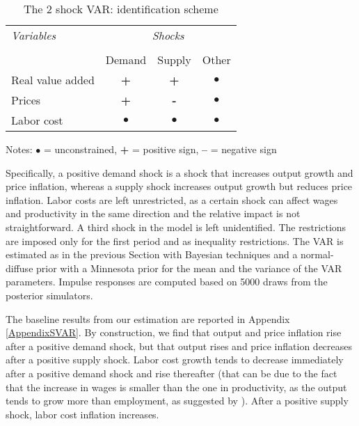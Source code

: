 \documentclass[11pt]{article}
\begin{document}
\begin{table}
\begin{center}
\caption{The 2 shock VAR: identification scheme}
\vskip 0.5cm
\label{tab: identification1}
\begin{tabular}{lccc}
\toprule
\textit{Variables} & \multicolumn{3}{c}{\textit{Shocks}} \\ \\[-1ex]
& Demand   & Supply  & Other \\
Real value added & \textbf{+} & \textbf{+} & $\bullet$ \\
Prices & \textbf{+} & \textbf{-} & $\bullet$ \\
Labor cost & $\bullet$     & $\bullet$     & $\bullet$ \\
\end{tabular}
\end{center}
\par
{\small \begin{center}Notes: $\bullet$ = unconstrained, \textbf{+} = positive sign,
\textbf{--} = negative sign \end{center}}
\end{table}

Specifically, a positive demand shock is a shock that increases output growth and price inflation, whereas a supply shock increases output growth but reduces price inflation. Labor costs are left unrestricted, as a certain shock can affect wages and productivity in the same direction and the relative impact is not straightforward. A third shock in the model is left unidentified. The restrictions are imposed only for the first period and as inequality restrictions. The VAR is estimated as in the previous Section with Bayesian techniques and a normal-diffuse prior with a Minnesota prior for the mean and the variance of the VAR parameters. Impulse responses are computed based on 5000 draws from the posterior simulators. 

The baseline results from our estimation are reported in Appendix \ref{AppendixSVAR}. By construction, we find that output and price inflation rise after a positive demand shock, but that output rises and price inflation decreases after a positive supply shock. Labor cost growth tends to decrease immediately after a positive demand shock and rise thereafter (that can be due to the fact that the increase in wages is smaller than the one in productivity, as the output tends to grow more than employment, as suggested by \cite{Hahn_Gumiel_18}). After a positive supply shock, labor cost inflation increases.
\end{document}
